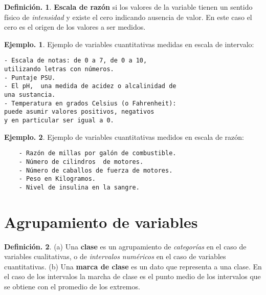 \documentclass[]{book}
\theoremstyle{definition}
\newtheorem{definition}{Definición.}[chapter]
\theoremstyle{definition}
\newtheorem{example}{Ejemplo.}[chapter]
\theoremstyle{definition}
\theoremstyle{remark}
\begin{document}
\begin{definition}
\protect\hypertarget{def:unnamed-chunk-60}{}{\label{def:unnamed-chunk-60} }\textbf{Escala de razón} si los valores de la variable tienen
un sentido físico de \emph{intensidad} y
existe el cero indicando ausencia de valor. En este caso
el cero es el origen de los valores a ser
medidos.\\
\end{definition}

\begin{example}
\protect\hypertarget{exm:unnamed-chunk-61}{}{\label{exm:unnamed-chunk-61} }Ejemplo de variables cuantitativas medidas en escala de
intervalo:

\begin{verbatim}
- Escala de notas: de 0 a 7, de 0 a 10,
utilizando letras con números. 
- Puntaje PSU.
- El pH,  una medida de acidez o alcalinidad de 
una sustancia.
- Temperatura en grados Celsius (o Fahrenheit):
puede asumir valores positivos, negativos
y en particular ser igual a 0.
\end{verbatim}
\end{example}

\begin{example}
\protect\hypertarget{exm:unnamed-chunk-62}{}{\label{exm:unnamed-chunk-62} }Ejemplo de variables cuantitativas medidos en escala de
razón:

\begin{verbatim}
    - Razón de millas por galón de combustible. 
    - Número de cilindros  de motores.
    - Número de caballos de fuerza de motores.
    - Peso en Kilogramos.
    - Nivel de insulina en la sangre.
\end{verbatim}
\end{example}

\hypertarget{agrupamiento-de-variables}{%
\section{Agrupamiento de variables}\label{agrupamiento-de-variables}}

\begin{definition}
\protect\hypertarget{def:unnamed-chunk-63}{}{\label{def:unnamed-chunk-63} }(a) Una \textbf{clase} es un agrupamiento de \emph{categorías} en
el caso de variables cualitativas, o de
\emph{intervalos numéricos} en el caso de variables
cuantitativas. (b) Una \textbf{marca de clase} es un
dato que representa a una clase. En el caso de los
intervalos la marcha de clase es el punto medio
de los intervalos que se obtiene con el promedio de los
extremos.
\end{definition}
\end{document}
